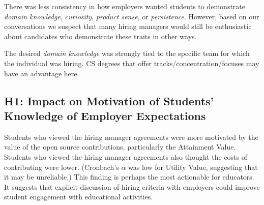 There was less consistency in how employers wanted students to demonstrate \textit{domain knowledge}, \textit{curiosity}, \textit{product sense}, or \textit{persistence}. However, based on our conversations we suspect that many hiring managers would still be enthusiastic about candidates who demonstrate these traits in other ways.

The desired \textit{domain knowledge} was strongly tied to the specific team for which the individual was hiring. CS degrees that offer tracks/concentration/focuses may have an advantage here.

\subsection{H1: Impact on Motivation of Students' Knowledge of Employer Expectations}

Students who viewed the hiring manager agreements were more motivated by the value of the open source contributions, particularly the Attainment Value. Students who viewed the hiring manager agreements also thought the costs of contributing were lower. (Cronbach's $\alpha$ was low for Utility Value, suggesting that it may be unreliable.) This finding is perhaps the most actionable for educators. It suggests that explicit discussion of hiring criteria with employers could improve student engagement with educational activities.